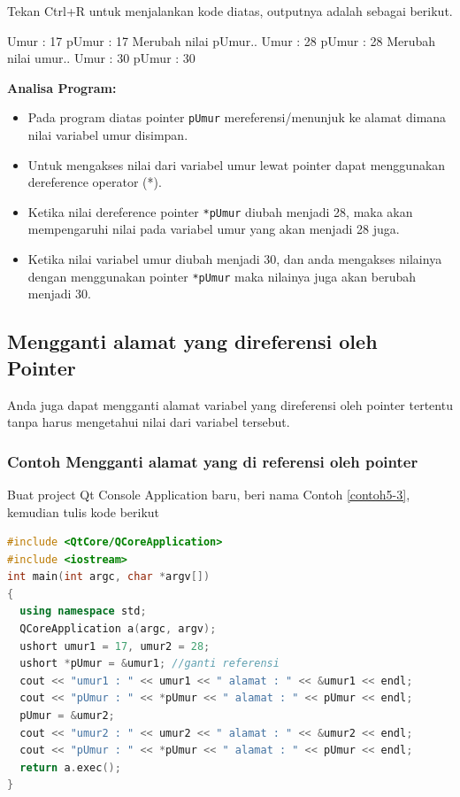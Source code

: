 Tekan Ctrl+R untuk menjalankan kode diatas, outputnya adalah sebagai
berikut.

\begin{lcverbatim}
Umur : 17
pUmur : 17
Merubah nilai pUmur..
Umur : 28
pUmur : 28
Merubah nilai umur..
Umur : 30
pUmur : 30
\end{lcverbatim}

\textbf{Analisa Program:}

\begin{itemize}

\item
  Pada program diatas pointer \texttt{pUmur} mereferensi/menunjuk ke
  alamat dimana nilai variabel umur disimpan.
\item
  Untuk mengakses nilai dari variabel umur lewat pointer dapat
  menggunakan dereference operator (*).
\item
  Ketika nilai dereference pointer \texttt{*pUmur} diubah menjadi 28,
  maka akan mempengaruhi nilai pada variabel umur yang akan menjadi 28
  juga.
\item
  Ketika nilai variabel umur diubah menjadi 30, dan anda mengakses
  nilainya dengan menggunakan pointer \texttt{*pUmur} maka nilainya juga
  akan berubah menjadi 30.
\end{itemize}

\subsection{Mengganti alamat yang direferensi oleh
Pointer}\label{mengganti-alamat-yang-direferensi-oleh-pointer}

Anda juga dapat mengganti alamat variabel yang direferensi oleh pointer
tertentu tanpa harus mengetahui nilai dari variabel tersebut.

\subsubsection*{Contoh  Mengganti alamat yang di referensi oleh pointer}

Buat project Qt Console Application baru, beri nama Contoh \ref{contoh5-3}, kemudian
tulis kode berikut

\begin{lstlisting}[language=c++, caption=Mengganti alamat yang di referensi oleh pointer, label=contoh5-3]
#include <QtCore/QCoreApplication>
#include <iostream>
int main(int argc, char *argv[])
{
  using namespace std;
  QCoreApplication a(argc, argv);
  ushort umur1 = 17, umur2 = 28;
  ushort *pUmur = &umur1; //ganti referensi
  cout << "umur1 : " << umur1 << " alamat : " << &umur1 << endl;
  cout << "pUmur : " << *pUmur << " alamat : " << pUmur << endl;
  pUmur = &umur2;
  cout << "umur2 : " << umur2 << " alamat : " << &umur2 << endl;
  cout << "pUmur : " << *pUmur << " alamat : " << pUmur << endl;
  return a.exec();
}
\end{lstlisting}

